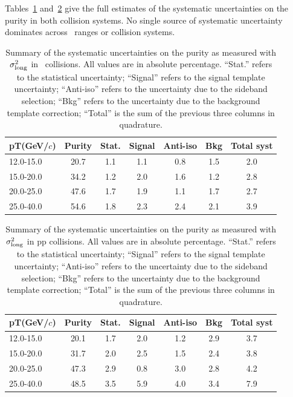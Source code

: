 Tables~\ref{tab:pursystppblambda} and~\ref{tab:pursystpplambda} give the full estimates of the systematic uncertainties on the purity in both collision systems. No single source of systematic uncertainty dominates across \pt~ranges or collision systems.


\begin{table}[htpb]
    \centering
        \caption{Summary of the systematic uncertainties on the purity as measured with $\sigma^{2}_{\mathrm{long}}$ in \pPb~collisions. All values are in absolute percentage. ``Stat.'' refers to the statistical uncertainty; ``Signal'' refers to the signal template uncertainty; ``Anti-iso'' refers to the uncertainty due to the sideband selection; ``Bkg'' refers to the uncertainty due to the background template correction; ``Total'' is the sum of the previous three columns in quadrature.}
    \begin{tabular*}{1.0\columnwidth}{@{\extracolsep{\fill}}lcccccc@{}}
    \hline
    	pT(GeV/$c$) & Purity & Stat. & Signal & Anti-iso & Bkg & Total syst \\ \hline
    	12.0-15.0 & 20.7 & 1.1 & 1.1 & 0.8 & 1.5 & 2.0 \\
    	15.0-20.0 & 34.2 & 1.2 & 2.0 & 1.6 & 1.2 & 2.8 \\
    	20.0-25.0 & 47.6 & 1.7 & 1.9 & 1.1 & 1.7 & 2.7 \\
    	25.0-40.0 & 54.6 & 1.8 & 2.3 & 2.4 & 2.1 & 3.9 \\
    \end{tabular*}
    \label{tab:pursystppblambda}
\end{table}


\begin{table}[htpb]
    \centering
        \caption{Summary of the systematic uncertainties on the purity as measured with $\sigma^{2}_{\mathrm{long}}$ in pp collisions. All values are in absolute percentage. ``Stat.'' refers to the statistical uncertainty; ``Signal'' refers to the signal template uncertainty; ``Anti-iso'' refers to the uncertainty due to the sideband selection; ``Bkg'' refers to the uncertainty due to the background template correction; ``Total'' is the sum of the previous three columns in quadrature.}
    \begin{tabular*}{1.0\columnwidth}{@{\extracolsep{\fill}}lcccccc@{}}
    \hline
    	pT(GeV/$c$) & Purity & Stat. & Signal & Anti-iso & Bkg & Total syst \\ \hline
    	12.0-15.0 & 20.1 & 1.7 & 2.0 & 1.2 & 2.9 & 3.7 \\
    	15.0-20.0 & 31.7 & 2.0 & 2.5 & 1.5 & 2.4 & 3.8 \\
    	20.0-25.0 & 47.3 & 2.9 & 0.8 & 3.0 & 2.8 & 4.2 \\
    	25.0-40.0 & 48.5 & 3.5 & 5.9 & 4.0 & 3.4 & 7.9 \\
    \end{tabular*}
    \label{tab:pursystpplambda}
\end{table}


